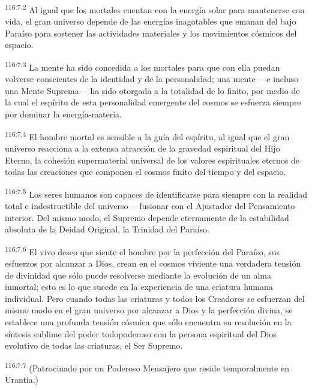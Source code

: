 \documentclass[twoside, 11pt]{book}
\begin{document}
\par
\textsuperscript{116:7.2} Al igual que los mortales cuentan con la energía solar para mantenerse con vida, el gran universo depende de las energías inagotables que emanan del bajo Paraíso para sostener las actividades materiales y los movimientos cósmicos del espacio.

\par
\textsuperscript{116:7.3} La mente ha sido concedida a los mortales para que con ella puedan volverse conscientes de la identidad y de la personalidad; una mente ---e incluso una Mente Suprema--- ha sido otorgada a la totalidad de lo finito, por medio de la cual el espíritu de esta personalidad emergente del cosmos se esfuerza siempre por dominar la energía-materia.

\par
\textsuperscript{116:7.4} El hombre mortal es sensible a la guía del espíritu, al igual que el gran universo reacciona a la extensa atracción de la gravedad espiritual del Hijo Eterno, la cohesión supermaterial universal de los valores espirituales eternos de todas las creaciones que componen el cosmos finito del tiempo y del espacio.

\par
\textsuperscript{116:7.5} Los seres humanos son capaces de identificarse para siempre con la realidad total e indestructible del universo ---fusionar con el Ajustador del Pensamiento interior. Del mismo modo, el Supremo depende eternamente de la estabilidad absoluta de la Deidad Original, la Trinidad del Paraíso.

\par
\textsuperscript{116:7.6} El vivo deseo que siente el hombre por la perfección del Paraíso, sus esfuerzos por alcanzar a Dios, crean en el cosmos viviente una verdadera tensión de divinidad que sólo puede resolverse mediante la evolución de un alma inmortal; esto es lo que sucede en la experiencia de una criatura humana individual. Pero cuando todas las criaturas y todos los Creadores se esfuerzan del mismo modo en el gran universo por alcanzar a Dios y la perfección divina, se establece una profunda tensión cósmica que sólo encuentra su resolución en la síntesis sublime del poder todopoderoso con la persona espiritual del Dios evolutivo de todas las criaturas, el Ser Supremo.

\par
\textsuperscript{116:7.7} (Patrocinado por un Poderoso Mensajero que reside temporalmente en Urantia.)
\end{document}
